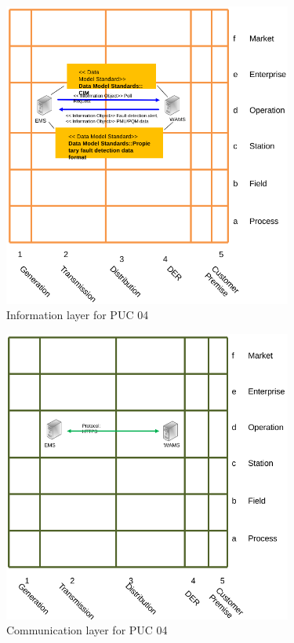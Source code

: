 \begin{figure}[!htb]\centering
  \includegraphics[width=9.5cm]{Data/i4.png}
\caption{Information layer for PUC 04}
\label{fig:i4}
\end{figure}


\begin{figure}[!htb]\centering
  \includegraphics[width=9.5cm]{Data/c4.png}
\caption{Communication layer for PUC 04}
\label{fig:c4}
\end{figure}



